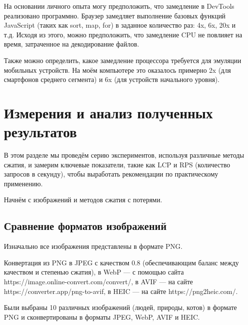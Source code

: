 \documentclass[12pt]{article}
\begin{document}
На основании личного опыта могу предположить, что замедление в DevTools реализовано программно.
Браузер замедляет выполнение базовых функций JavaScript (таких как sort, map, for)
в заданное количество раз: 4x, 6x, 20x и т.д.
Исходя из этого, можно предположить, что замедление CPU не повлияет на время,
затраченное на декодирование файлов.

Также можно определить, какое замедление процессора требуется для эмуляции мобильных устройств.
На моём компьютере это оказалось примерно 2x (для смартфонов среднего сегмента)
и 6x (для устройств начального уровня).

\section{Измерения и анализ полученных результатов}

В этом разделе мы проведём серию экспериментов, используя различные методы сжатия,
и замерим ключевые показатели, такие как LCP и RPS (количество запросов в секунду),
чтобы выработать рекомендации по практическому применению.

Начнём с изображений и методов сжатия с потерями.

\subsection{Сравнение форматов изображений}

Изначально все изображения представлены в формате PNG.

Конвертация из PNG в JPEG с качеством 0.8 (обеспечивающим баланс между качеством
и степенью сжатия), в WebP — с помощью сайта https://image.online-convert.com/convert/,
в AVIF — на сайте https://converter.app/png-to-avif,
в HEIC — на сайте https://png2heic.com/.

Были выбраны 10 различных изображений (людей, природы, котов)
в формате PNG и сконвертированы в форматы JPEG, WebP, AVIF и HEIC.
\end{document}
